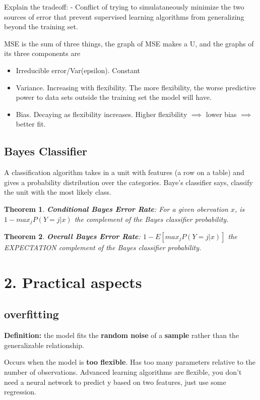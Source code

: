 \documentclass{article}
\newtheorem{theorem}{Theorem}
\begin{document}
Explain the tradeoff:
- Conflict of trying to simulataneously minimize the two sources of error that prevent supervised learning algorithms from generalizing beyond the training set. 

MSE is the sum of three things, the graph of MSE makes a U, and the graphs of its three components are
\begin{itemize}
\item Irreducible error/Var(epsilon). Constant
\item Variance. Increasing with flexibility. The more flexibility, the worse predictive power to  data sets outside the training set the model will have.
\item Bias. Decaying as flexibility increases. Higher flexibility $\implies$ lower bias $\implies$  better fit. 
\end{itemize}

\subsection{Bayes Classifier}
A classification algorithm takes in a unit with features (a row on a table) and gives a probability distribution over the categories. Baye's classifier says, classify the unit with the most likely class.

\begin{theorem}
\textbf{Conditional Bayes Error Rate}: For a given obervation $x$, is $1-max_{j} P(Y =j |x)$ the complement of the Bayes classifier probability. 
\end{theorem}

\begin{theorem}
\textbf{Overall Bayes Error Rate}:  $1-E[max_{j} P(Y =j |x)]$ the EXPECTATION complement of the Bayes classifier probability. 
\end{theorem}

\section{2. Practical aspects}

\subsection{overfitting}
\textbf{Definition:} the model fits the \textbf{random noise} of a \textbf{sample} rather than the generalizable relationship.

Occurs when the model is \textbf{too flexible}. Has too many parameters relative to the number of observations. Advanced learning algorithms are flexible, you don't need a neural network to predict y based on two features, just use some regression.
\end{document}
